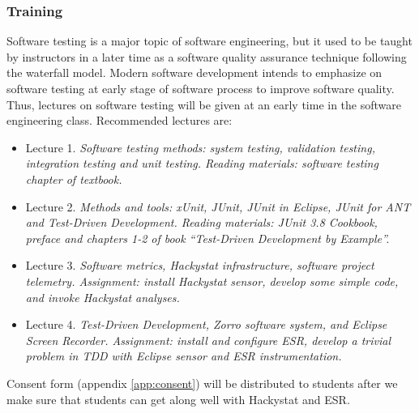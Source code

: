 \subsubsection{Training}
Software testing is a major topic of software engineering, but it used to
be taught by instructors in a later time as a software quality assurance
technique following the waterfall model. Modern software development
intends to emphasize on software testing at early stage of software process
to improve software quality. Thus, lectures on software testing will be
given at an early time in the software engineering class. Recommended
lectures are:
\begin{itemize}
\item {Lecture 1.} \textit{Software testing methods: system testing,
    validation testing, integration testing and unit testing. Reading
    materials: software testing chapter of textbook.}
\item {Lecture 2.} \textit{Methods and tools: xUnit, JUnit, JUnit in
    Eclipse, JUnit for ANT and Test-Driven Development. Reading materials:
    JUnit 3.8 Cookbook, preface and chapters 1-2 of book ``Test-Driven
    Development by Example''\cite{Beck:03}.}
\item {Lecture 3.} \textit{Software metrics, Hackystat infrastructure,
    software project telemetry. Assignment: install Hackystat sensor,
    develop some simple code, and invoke Hackystat analyses.}
\item {Lecture 4.} \textit{Test-Driven Development, Zorro software system,
    and Eclipse Screen Recorder. Assignment: install and configure ESR,
    develop a trivial problem in TDD with Eclipse sensor and ESR
    instrumentation.}
\end{itemize}

Consent form (appendix \ref{app:consent}) will be distributed to students
after we make sure that students can get along well with Hackystat and ESR.


